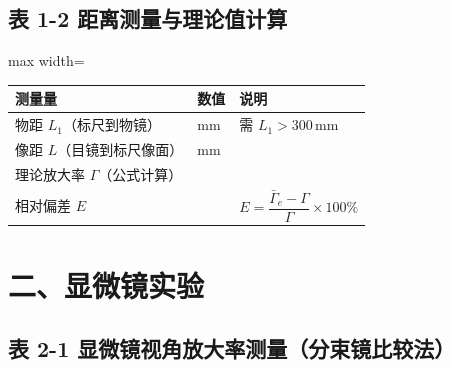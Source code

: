\documentclass[12pt, a4paper]{article}
\begin{document}
\vspace{0.3cm}

\subsection*{表 1-2 \quad 距离测量与理论值计算}

\begin{table}[H]
  \centering
  \begin{adjustbox}{max width=\textwidth}
    \begin{tabular}{p{6cm}p{3cm}p{5cm}}
      \toprule
      测量量 & 数值 & 说明 \\
      \midrule
      物距 $L_1$（标尺到物镜）& \hspace{1.5cm} mm & 需 $L_1 > 300\,\text{mm}$ \\[0.4cm]
      像距 $L$（目镜到标尺像面）& \hspace{1.5cm} mm & \\[0.4cm]
      \midrule
      理论放大率 $\Gamma$（公式计算）& & \\[0.6cm]
      相对偏差 $E$ & & $E = \dfrac{\bar{\Gamma}_e - \Gamma}{\Gamma} \times 100\%$ \\[0.6cm]
      \bottomrule
    \end{tabular}
  \end{adjustbox}
\end{table}

\vspace{2.5cm}

\newpage

\section*{二、显微镜实验}

\subsection*{表 2-1 \quad 显微镜视角放大率测量（分束镜比较法）}


\vspace{0.3cm}
\end{document}
